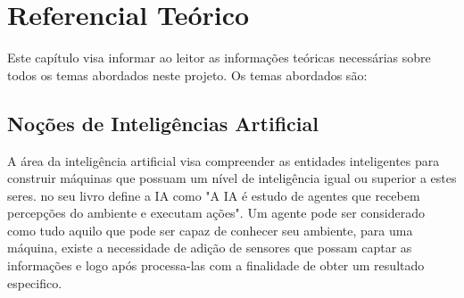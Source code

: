 \documentclass[
12pt,				%
oneside,			%
a4paper,			%
english,			%
french,				%
spanish,			%
brazil				%
]{abntex2}
\begin{document}




\chapter{Referencial Teórico}

Este capítulo visa informar ao leitor as informações teóricas necessárias sobre todos os temas abordados neste projeto. Os temas abordados são: 

\section{Noções de Inteligências Artificial}

A área da inteligência artificial visa compreender as entidades inteligentes para construir máquinas que possuam um nível de inteligência igual ou superior a estes seres. \cite{russell2016artificial} no seu livro define a IA como "A IA é estudo de agentes que recebem percepções do ambiente e executam ações". Um agente pode ser considerado como tudo aquilo que pode ser capaz de conhecer seu ambiente, para uma máquina, existe a necessidade de adição de sensores que possam captar as informações e logo após processa-las com a finalidade de obter um resultado especifico.

\end{document}
